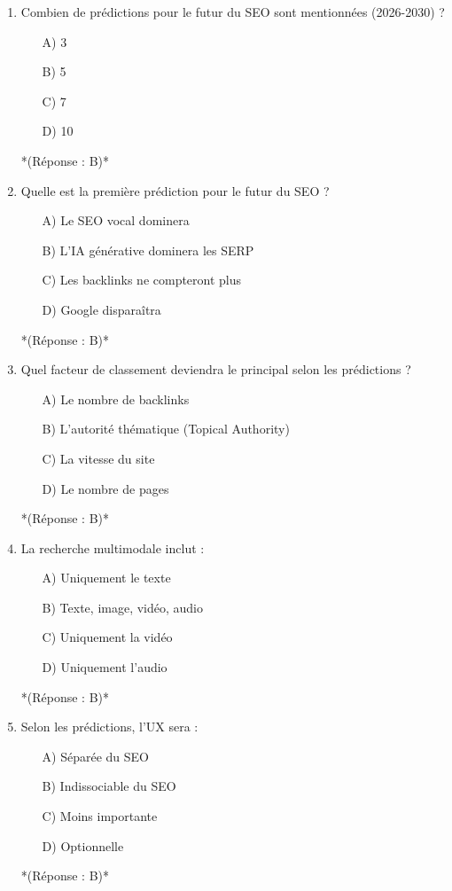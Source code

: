 \documentclass[12pt,a4paper,twoside]{report}
\begin{document}
\begin{enumerate}
    \item Combien de prédictions pour le futur du SEO sont mentionnées (2026-2030) ?
    \begin{itemize}
        \item[A)] 3
        \item[B)] 5
        \item[C)] 7
        \item[D)] 10
    \end{itemize}
    *(Réponse : B)*

    \item Quelle est la première prédiction pour le futur du SEO ?
    \begin{itemize}
        \item[A)] Le SEO vocal dominera
        \item[B)] L'IA générative dominera les SERP
        \item[C)] Les backlinks ne compteront plus
        \item[D)] Google disparaîtra
    \end{itemize}
    *(Réponse : B)*

    \item Quel facteur de classement deviendra le principal selon les prédictions ?
    \begin{itemize}
        \item[A)] Le nombre de backlinks
        \item[B)] L'autorité thématique (Topical Authority)
        \item[C)] La vitesse du site
        \item[D)] Le nombre de pages
    \end{itemize}
    *(Réponse : B)*

    \item La recherche multimodale inclut :
    \begin{itemize}
        \item[A)] Uniquement le texte
        \item[B)] Texte, image, vidéo, audio
        \item[C)] Uniquement la vidéo
        \item[D)] Uniquement l'audio
    \end{itemize}
    *(Réponse : B)*

    \item Selon les prédictions, l'UX sera :
    \begin{itemize}
        \item[A)] Séparée du SEO
        \item[B)] Indissociable du SEO
        \item[C)] Moins importante
        \item[D)] Optionnelle
    \end{itemize}
    *(Réponse : B)*


\end{enumerate}
\end{document}
